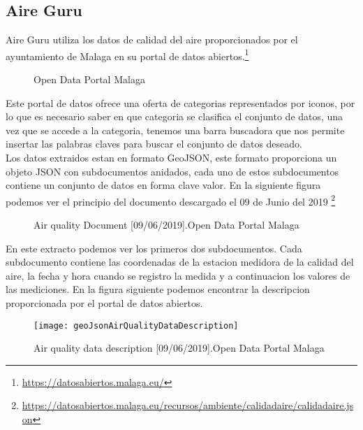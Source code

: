 \subsection{Aire Guru}

Aire Guru utiliza los datos de calidad del aire proporcionados por el ayuntamiento de Malaga en su portal de datos abiertos.\footnote{\url{https://datosabiertos.malaga.eu/}}
\begin{figure}[h]
    \centering
    \hfill
  
  \caption{Open Data Portal Malaga}
    \end{figure}
Este portal de datos ofrece una oferta de categorias representados por iconos, por lo que es necesario saber en que categoria se clasifica el conjunto
de datos, una vez que se accede a la categoria, tenemos una barra buscadora que nos permite insertar las palabras claves para buscar el conjunto de datos
deseado.\\

Los datos extraidos estan en formato GeoJSON, este formato proporciona un objeto JSON con subdocumentos anidados, cada uno de estos
subdocumentos contiene un conjunto de datos en forma clave valor. 
En la siguiente figura podemos ver el principio del documento descargado el 09 de Junio del 2019 
\footnote{\url{https://datosabiertos.malaga.eu/recursos/ambiente/calidadaire/calidadaire.json}}\\
\newpage
\begin{figure}[h]
    \centering
   \hfill
    \caption{Air quality Document [09/06/2019].Open Data Portal Malaga}
    \end{figure}
    
En este extracto podemos ver los primeros dos subdocumentos. Cada subdocumento contiene las coordenadas de la estacion medidora de la calidad
del aire, la fecha y hora cuando se registro la medida y a continuacion los valores de las mediciones. 
En la figura siguiente podemos encontrar la descripcion proporcionada por el portal de datos abiertos.
\begin{figure}[ht]
    \centering
    \texttt{[image: geoJsonAirQualityDataDescription]}
    \caption{Air quality data description [09/06/2019].Open Data Portal Malaga}
\end{figure}


